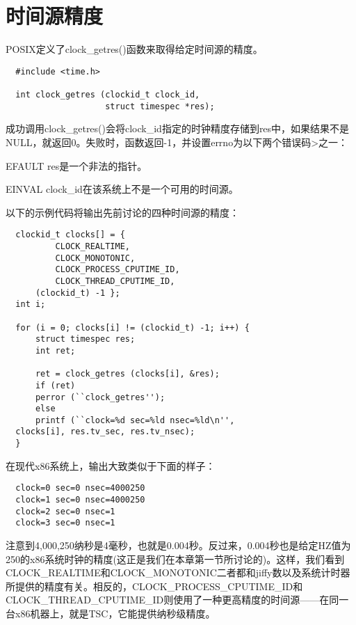 \section{时间源精度}

POSIX定义了clock\_getres()函数来取得给定时间源的精度。

\begin{lstlisting}
  #include <time.h>

  int clock_getres (clockid_t clock_id,
                    struct timespec *res);
\end{lstlisting}
成功调用clock\_getres()会将clock\_id指定的时钟精度存储到res中，如果结果不是NULL，就返回0。失败时，函数返回-1，并设置errno为以下两个错误码>之一：

\begin{eqlist*}
\item [EFAULT]
res是一个非法的指针。 
\item [EINVAL]
clock\_id在该系统上不是一个可用的时间源。 
\end{eqlist*}

以下的示例代码将输出先前讨论的四种时间源的精度：

\begin{lstlisting}
  clockid_t clocks[] = {
          CLOCK_REALTIME,
          CLOCK_MONOTONIC,
          CLOCK_PROCESS_CPUTIME_ID,
          CLOCK_THREAD_CPUTIME_ID,
	  (clockid_t) -1 };
  int i;

  for (i = 0; clocks[i] != (clockid_t) -1; i++) {
      struct timespec res;
      int ret;

      ret = clock_getres (clocks[i], &res);
      if (ret)
	  perror (``clock_getres'');
      else
	  printf (``clock=%d sec=%ld nsec=%ld\n'',
  clocks[i], res.tv_sec, res.tv_nsec);
  }
\end{lstlisting}

在现代x86系统上，输出大致类似于下面的样子： 

\begin{verbatim}
  clock=0 sec=0 nsec=4000250
  clock=1 sec=0 nsec=4000250
  clock=2 sec=0 nsec=1
  clock=3 sec=0 nsec=1
\end{verbatim}

注意到4,000,250纳秒是4毫秒，也就是0.004秒。反过来，0.004秒也是给定HZ值为250的x86系统时钟的精度(这正是我们在本章第一节所讨论的)。这样，我们看到CLOCK\_REALTIME和CLOCK\_MONOTONIC二者都和jiffy数以及系统计时器所提供的精度有关。相反的，CLOCK\_PROCESS\_CPUTIME\_ID和CLOCK\_THREAD\_CPUTIME\_ID则使用了一种更高精度的时间源——在同一台x86机器上，就是TSC，它能提供纳秒级精度。

